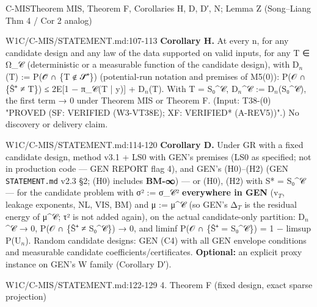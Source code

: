 \begin{card}{C-MIS}{Theorem MIS, Theorem F, Corollaries H, D, D′, N; Lemma Z (Song–Liang Thm 4 / Cor 2 analog)}
\begin{stmt}{W1C/C-MIS/STATEMENT.md:107-113}
\textbf{Corollary H.} At every n, for any candidate design and any law of the data supported on valid inputs, for any
T ∈ Ω\_𝒞 (deterministic or a measurable function of the candidate design), with D$_{n}$(T) := P(𝒪̄ ∩ \{T ∉ 𝒮̄⁺\}) (potential-run
notation and premises of M5(0)): P(𝒪 ∩ \{Ŝ⁺ ≠ T\}) ≤ 2E[1 − π\_𝒞(T | y)] + D$_{n}$(T). With T = S₀\^{}𝒞, D$_{n}$\^{}𝒞 := D$_{n}$(S₀\^{}𝒞), the
first term → 0 under Theorem MIS or Theorem F. (Input: T38-(0) "PROVED (SF: VERIFIED (W3-VT38E); XF: VERIFIED* (A-REV5))".)
No discovery or delivery claim.
\end{stmt}
\begin{stmt}{W1C/C-MIS/STATEMENT.md:114-120}
\textbf{Corollary D.} Under GR with a fixed candidate design, method v3.1 + LS0 with GEN's premises (LS0 as specified; not in
production code — GEN REPORT flag 4), and GEN's (H0)–(H2)
(GEN \texttt{STATEMENT.md} v2.3 §2; (H0) includes \textbf{BM-∞}) — or (H0), (H2) with S* = S₀\^{}𝒞 — for the candidate problem with
σ² := σ\_𝒞² \textbf{everywhere in GEN} (v$_{T}$, leakage exponents, NL, VIS, BM) and μ := μ\^{}𝒞 (so GEN's Δ$_{T}$ is the residual energy
of μ\^{}𝒞; τ² is not added again), on the actual candidate-only partition: D$_{n}$\^{}𝒞 → 0, P(𝒪 ∩ \{Ŝ⁺ ≠ S₀\^{}𝒞\}) → 0, and
liminf P(𝒪 ∩ \{Ŝ⁺ = S₀\^{}𝒞\}) = 1 − limsup P(U$_{n}$). Random candidate designs: GEN (C4) with all GEN envelope conditions and
measurable candidate coefficients/certificates. \textbf{Optional:} an explicit proxy instance on GEN's W family (Corollary D′).
\end{stmt}
\begin{stmt}{W1C/C-MIS/STATEMENT.md:122-129}
4. Theorem F (fixed design, exact sparse projection)


\end{stmt}
\end{card}
